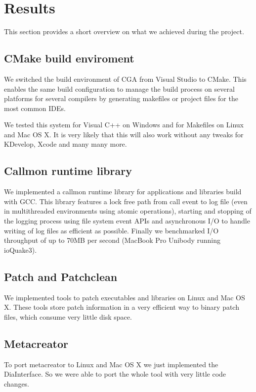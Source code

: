 
\section{Results}

This section provides a short overview on what we achieved during the project.

\subsection{CMake build enviroment} We switched the build environment of CGA from Visual Studio to CMake. This enables the same build configuration to manage the build process on several platforms for several compilers by generating makefiles or project files  for the most common IDEs.

We tested this system for Visual C++ on Windows and for Makefiles on Linux and Mac OS X. It is very likely that this will also work without any tweaks for KDevelop, Xcode and many many more.

\subsection{Callmon runtime library} We implemented a callmon runtime library for applications and libraries build with GCC. This library features a lock free path from call event to log file (even in multithreaded environments using atomic operations), starting and stopping of the logging process using file system event APIs and asynchronous I/O to handle writing of log files as efficient as possible. Finally we benchmarked I/O throughput of up to 70MB per second (MacBook Pro Unibody running ioQuake3).

\subsection{Patch and Patchclean} We implemented tools to patch executables and libraries on Linux and Mac OS X. These tools store patch information in a very efficient way to binary patch files, which consume very little disk space.


\subsection{Metacreator} To port metacreator to Linux and Mac OS X we just implemented the DiaInterface. So we were able to port the whole tool with very little code changes.

